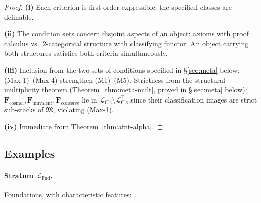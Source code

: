 \documentclass[11pt]{article}
\theoremstyle{plain}
\theoremstyle{definition}
\newcommand{\fM}{\mathfrak{M}}
\newcommand{\LFnd}{\mathcal{L}_{\mathrm{Fnd}}}
\newcommand{\LCls}{\mathcal{L}_{\mathrm{Cls}}}
\newcommand{\LClsMax}{\mathcal{L}_{\mathrm{Cls}}^{\top}}
\begin{document}
\begin{proof}
\textbf{(i)} Each criterion is first-order-expressible; the specified classes are definable.

\textbf{(ii)} The condition sets concern disjoint aspects of an object: axioms with proof calculus vs.\ $2$-categorical structure with classifying functor. An object carrying both structures satisfies both criteria simultaneously.

\textbf{(iii)} Inclusion from the two sets of conditions specified in \S\ref{sec:meta} below: (Max-1)--(Max-4) strengthen (M1)--(M5). Strictness from the structural multiplicity theorem (Theorem~\ref{thm:meta-mult}, proved in \S\ref{sec:meta} below): $\mathbf{F}_{\mathrm{cosmoi}}, \mathbf{F}_{\mathrm{univalent}}, \mathbf{F}_{\mathrm{cohesive}}$ lie in $\LCls \setminus \LClsMax$ since their classification images are strict sub-stacks of $\fM$, violating (Max-1).

\textbf{(iv)} Immediate from Theorem~\ref{thm:afnt-alpha}.
\end{proof}

\subsection{Examples}

\paragraph{Stratum $\LFnd$.} Foundations, with characteristic features:
\end{document}
